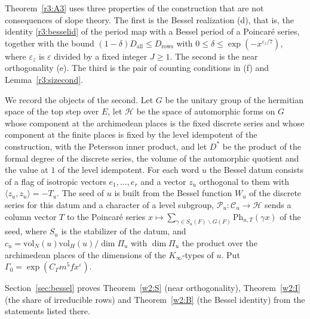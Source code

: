 Theorem~\ref{r3:A3} uses three properties of the construction that are not consequences of slope theory. The first is the Bessel realization (d), that is, the identity \eqref{r3:besselid} of the period map with a Bessel period of a Poincar\'e series, together with the bound $(1-\delta)D_{\mathrm{all}}\le D_{\mathrm{rows}}$ with $0\le\delta\le\exp(-x^{\varepsilon_z/7})$, where $\varepsilon_z$ is $\varepsilon$ divided by a fixed integer $J\ge1$. The second is the near orthogonality (e). The third is the pair of counting conditions in (f) and Lemma~\ref{r3:sizecond}.

We record the objects of the second. Let $G$ be the unitary group of the hermitian space of the top step over $E$, let $\mathcal H$ be the space of automorphic forms on $G$ whose component at the archimedean places is the fixed discrete series and whose component at the finite places is fixed by the level idempotent of the construction, with the Petersson inner product, and let $D^*$ be the product of the formal degree of the discrete series, the volume of the automorphic quotient and the value at $1$ of the level idempotent. For each word $u$ the Bessel datum consists of a flag of isotropic vectors $e_1,\dots,e_r$ and a vector $z_u$ orthogonal to them with $\langle z_u,z_u\rangle=-T_u$. The seed of $u$ is built from the Bessel function $W_u$ of the discrete series for this datum and a character of a level subgroup, $\mathcal P_u\colon\mathcal C_u\to\mathcal H$ sends a column vector $T$ to the Poincar\'e series $x\mapsto\sum_{\gamma\in S_u(F)\backslash G(F)}\mathrm{Ph}_{u,T}(\gamma x)$ of the seed, where $S_u$ is the stabilizer of the datum, and $c_u=\mathrm{vol}_N(u)\mathrm{vol}_H(u)/\dim\Pi_u$ with $\dim\Pi_u$ the product over the archimedean places of the dimensions of the $K_\infty$-types of $u$. Put $\Gamma_0=\exp(C_\Gamma m^5fx^\varepsilon)$.

Section~\ref{sec:bessel} proves Theorem~\ref{w2:S} (near orthogonality), Theorem~\ref{w2:I} (the share of irreducible rows) and Theorem~\ref{w2:B} (the Bessel identity) from the statements listed there.
